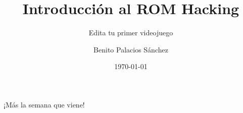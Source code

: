 \documentclass[usenames,dvipsnames]{beamer}
\title{Introducción al ROM Hacking}
\subtitle{Edita tu primer videojuego}
\date[Febrero de 2016]{\today}
\author{Benito Palacios Sánchez}
\institute[IEEE SB UGR]{Rama estudiantil de IEEE en la UGR}
\begin{document}
    \begin{frame}[plain]
        \titlepage{}
    \end{frame}

    
    

    \section{}
    \begin{frame}
        \begin{center}
            \huge ¡Más la semana que viene!
        \end{center}
    \end{frame}
\end{document}
